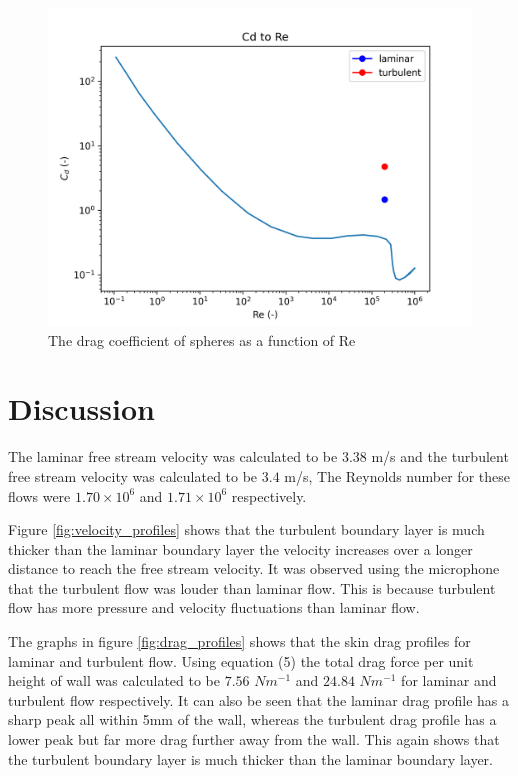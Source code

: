 \documentclass{article}
\begin{document}
\begin{figure}[H]
\centering
\includegraphics[width=1\textwidth]{CdRe_mloss.png}
\caption{\label{fig:CdRe_mloss} The drag coefficient of spheres as a function of Re}
\end{figure}

\section{Discussion}

The laminar free stream velocity was calculated to be $3.38$ m/s and the 
turbulent free stream velocity was calculated to be $3.4$ m/s, The Reynolds number
for these flows were $1.70\times 10^6$ and $1.71 \times 10^6$ respectively.

Figure \ref{fig:velocity_profiles} shows that the turbulent boundary layer
is much thicker than the laminar boundary layer the velocity increases over a
longer distance to reach the free stream velocity. 
It was observed using the microphone that the turbulent flow was louder than laminar flow.
This is because turbulent flow has more pressure and velocity fluctuations than laminar flow.

The graphs in figure \ref{fig:drag_profiles} shows that the skin drag profiles for laminar and turbulent flow.
Using equation (5) the total drag force per unit height of wall was calculated to be $ 7.56 $ $Nm^{-1}$ and
$ 24.84 $ $Nm^{-1}$ for laminar and turbulent flow respectively.
It can also be seen that the laminar drag profile has a sharp peak all within 5mm of the wall, 
whereas the turbulent drag profile has a lower peak but far more drag further away from the wall.
This again shows that the turbulent boundary layer is much thicker than the laminar boundary layer.
\end{document}
